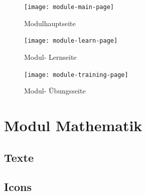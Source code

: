 \begin{figure}[!h]
  \centering
  \texttt{[image: module-main-page]}\\
  \caption{Modulhauptseite}
  \label{fig:module-main-page}
\end{figure}

\begin{figure}[!ht]
  \centering
  \texttt{[image: module-learn-page]}\\
  \caption{Modul- Lernseite}
  \label{fig:module-main-page}
\end{figure}

\begin{figure}[!ht]
  \centering
  \texttt{[image: module-training-page]}\\
  \caption{Modul- Übungsseite}
  \label{fig:module-training-page}
\end{figure}

\section{Modul Mathematik}
\subsection{Texte}
\subsection{Icons}
